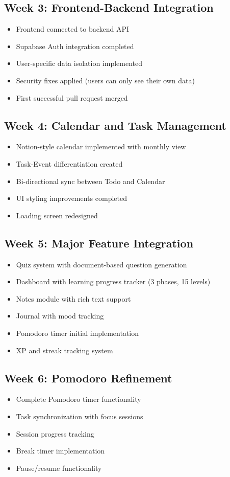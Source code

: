	\subsection{Week 3: Frontend-Backend Integration}
	\begin{itemize}
	    \item Frontend connected to backend API
	    \item Supabase Auth integration completed
	    \item User-specific data isolation implemented
	    \item Security fixes applied (users can only see their own data)
	    \item First successful pull request merged
	\end{itemize}

	\subsection{Week 4: Calendar and Task Management}
	\begin{itemize}
	    \item Notion-style calendar implemented with monthly view
	    \item Task-Event differentiation created
	    \item Bi-directional sync between Todo and Calendar
	    \item UI styling improvements completed
	    \item Loading screen redesigned
	\end{itemize}

	\subsection{Week 5: Major Feature Integration}
	\begin{itemize}
	    \item Quiz system with document-based question generation
	    \item Dashboard with learning progress tracker (3 phases, 15 levels)
	    \item Notes module with rich text support
	    \item Journal with mood tracking
	    \item Pomodoro timer initial implementation
	    \item XP and streak tracking system
	\end{itemize}

	\subsection{Week 6: Pomodoro Refinement}
	\begin{itemize}
	    \item Complete Pomodoro timer functionality
	    \item Task synchronization with focus sessions
	    \item Session progress tracking
	    \item Break timer implementation
	    \item Pause/resume functionality
	\end{itemize}

